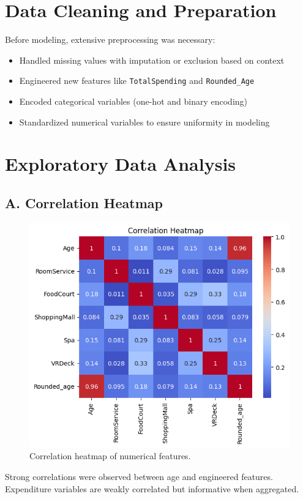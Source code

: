 \documentclass[12pt]{article}
\begin{document}
\section{Data Cleaning and Preparation}
Before modeling, extensive preprocessing was necessary:
\begin{itemize}
    \item Handled missing values with imputation or exclusion based on context
    \item Engineered new features like \texttt{TotalSpending} and \texttt{Rounded\_Age}
    \item Encoded categorical variables (one-hot and binary encoding)
    \item Standardized numerical variables to ensure uniformity in modeling
\end{itemize}

\section{Exploratory Data Analysis}
\subsection*{A. Correlation Heatmap}
\begin{figure}[H]
    \centering
    \includegraphics[width=0.6\linewidth]{output.png}
    \caption{Correlation heatmap of numerical features.}
\end{figure}
\noindent
Strong correlations were observed between age and engineered features. Expenditure variables are weakly correlated but informative when aggregated.
\end{document}
